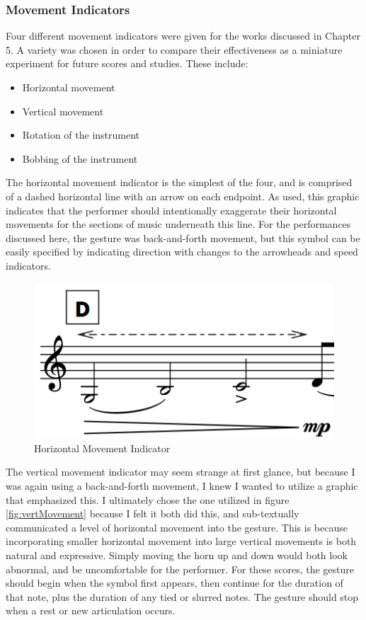 \subsubsection{Movement Indicators}
Four different movement indicators were given for the works discussed in Chapter 5. A variety was chosen in order to compare their effectiveness as a miniature experiment for future scores and studies. These include: 

\begin{itemize}
    \item Horizontal movement
    \item Vertical movement
    \item Rotation of the instrument
    \item Bobbing of the instrument
\end{itemize}

The horizontal movement indicator is the simplest of the four, and is comprised of a dashed horizontal line with an arrow on each endpoint. As used, this graphic indicates that the performer should intentionally exaggerate their horizontal movements for the sections of music underneath this line. For the performances discussed here, the gesture was back-and-forth movement, but this symbol can be easily specified by indicating direction with changes to the arrowheads and speed indicators.

\begin{figure}
    \centering
    \includegraphics{Scores/horizontal.png}
    \caption{Horizontal Movement Indicator}
    \label{fig:horMovement}
\end{figure}

The vertical movement indicator may seem strange at first glance, but because I was again using a back-and-forth movement, I knew I wanted to utilize a graphic that emphasized this. I ultimately chose the one utilized in figure \ref{fig:vertMovement} because I felt it both did this, and sub-textually communicated a level of horizontal movement into the gesture. This is because incorporating smaller horizontal movement into large vertical movements is both natural and expressive. Simply moving the horn up and down would both look abnormal, and be uncomfortable for the performer. For these scores, the gesture should begin when the symbol first appears, then continue for the duration of that note, plus the duration of any tied or slurred notes. The gesture should stop when a rest or new articulation occurs.


